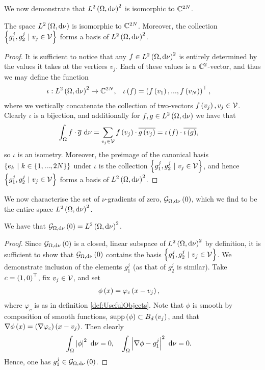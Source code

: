 We now demonstrate that $L^{2}\left( \Omega,\mathrm{d}\nu \right)^2$ is isomorphic to $\mathbb{C}^{2N}$.
\begin{lemma}
	The space $L^{2}\left( \Omega,\mathrm{d}\nu \right)$ is isomorphic to $\mathbb{C}^{2N}$.
	Moreover, the collection $\clbracs{g_1^j, g_2^j \ \vert \ v_j\in\vertSet}$ forms a basis of $L^{2}\left( \Omega,\mathrm{d}\nu \right)^2$.
\end{lemma}
\begin{proof}
	It is sufficient to notice that any $f\in L^{2}\left( \Omega,\mathrm{d}\nu \right)^2$ is entirely determined by the values it takes at the vertices $v_j$.
	Each of these values is a $\mathbb{C}^2$-vector, and thus we may define the function
	\begin{align*}
		\iota:L^{2}\left( \Omega,\mathrm{d}\nu \right)^2 \rightarrow\mathbb{C}^{2N}, &\quad
		\iota\left( f \right) = \left(  f\left( v_1 \right), ..., f\left( v_N \right)  \right)^\top,
	\end{align*}
	where we vertically concatenate the collection of two-vectors $f\left( v_j \right), v_j\in\mathcal{V}$.
	Clearly $\iota$ is a bijection, and additionally for $f,g\in L^{2}\left( \Omega,\mathrm{d}\nu \right)$ we have that
	\begin{align*}
		\int_{\Omega}f\cdot \overline{g} \ \mathrm{d}\nu 
		&= \sum_{v_j\in\mathcal{V}} f\left( v_j \right)\cdot\overline{g\left( v_j \right)}
		= \iota\left( f \right)\cdot\overline{\iota\left( g \right)},
	\end{align*}
	so $\iota$ is an isometry.
	Moreover, the preimage of the canonical basis $\clbracs{e_k \ \vert \ k\in\clbracs{1,...,2N}}$ under $\iota$ is the collection $\clbracs{g_1^j, g_2^j \ \vert \ v_j\in\vertSet}$, and hence $\clbracs{g_1^j, g_2^j \ \vert \ v_j\in\vertSet}$ forms a basis of $L^{2}\left( \Omega,\mathrm{d}\nu \right)^2$.
\end{proof}

We now characterise the set of $\nu$-gradients of zero, $\mathcal{G}_{ \Omega, \mathrm{d}\nu}\left( 0 \right)$, which we find to be the entire space $L^{2}\left( \Omega,\mathrm{d}\nu \right)^2$.
\begin{prop} \label{prop:CharPointMassGradZero}
	We have that $\mathcal{G}_{ \Omega, \mathrm{d}\nu}\left( 0 \right) = L^{2}\left( \Omega,\mathrm{d}\nu \right)^2$.
\end{prop}
\begin{proof}
	Since $\mathcal{G}_{ \Omega, \mathrm{d}\nu}\left( 0 \right)$ is a closed, linear subspace of $L^{2}\left( \Omega,\mathrm{d}\nu \right)^2$ by definition, it is sufficient to show that $\mathcal{G}_{ \Omega, \mathrm{d}\nu}\left( 0 \right)$ contains the basis $\clbracs{g_1^j, g_2^j \ \vert \ v_j\in\vertSet}$.
	We demonstrate inclusion of the elements $g^j_1$ (as that of $g^j_2$ is similar).
	Take $c=\left( 1,0 \right)^{\top}$, fix $v_j\in\mathcal{V}$, and set
	\begin{align*}
		\phi\left( x \right) &= \varphi_c\left( x-v_j \right),
	\end{align*}
	where $\varphi_c$ is as in definition \ref{def:UsefulObjects}.
	Note that $\phi$ is smooth by composition of smooth functions, $\mathrm{supp}\left( \phi \right)\subset B_{d}\left( v_j \right)$, and that $\nabla\phi\left( x \right) = \left( \nabla\varphi_c \right)\left( x-v_j \right)$.
	Then clearly
	\begin{align*}
		\int_{\Omega}\left\lvert \phi \right\rvert^2 \ \mathrm{d}\nu = 0,
		&\quad \int_{\Omega}\left\lvert \nabla\phi - g^j_1 \right\rvert^2 \ \mathrm{d}\nu = 0.
	\end{align*}
	Hence, one has $g^j_1\in\mathcal{G}_{ \Omega, \mathrm{d}\nu}\left( 0 \right)$.
\end{proof}

